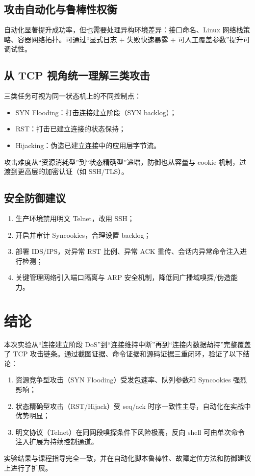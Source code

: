 \documentclass[12pt,hyperref,a4paper,UTF8,fontset=none]{ctexart}
\begin{document}
\subsection{攻击自动化与鲁棒性权衡}
自动化显著提升成功率，但也需要处理异构环境差异：接口命名、Linux 网络栈策略、容器网络拓扑。可通过“显式日志 + 失败快速暴露 + 可人工覆盖参数”提升可调试性。

\subsection{从 TCP 视角统一理解三类攻击}
三类任务可视为同一状态机上的不同控制点：
\begin{itemize}
    \item SYN Flooding：打击连接建立阶段（SYN backlog）；
    \item RST：打击已建立连接的状态保持；
    \item Hijacking：伪造已建立连接中的应用层字节流。
\end{itemize}
攻击难度从“资源消耗型”到“状态精确型”递增，防御也从容量与 cookie 机制，过渡到更高层的加密认证（如 SSH/TLS）。

\subsection{安全防御建议}
\begin{enumerate}
    \item 生产环境禁用明文 Telnet，改用 SSH；
    \item 开启并审计 Syncookies，合理设置 backlog；
    \item 部署 IDS/IPS，对异常 RST 比例、异常 ACK 重传、会话内异常命令注入进行检测；
    \item 关键管理网络引入端口隔离与 ARP 安全机制，降低同广播域嗅探/伪造能力。
\end{enumerate}

\section{结论}
本次实验从“连接建立阶段 DoS”到“连接维持中断”再到“连接内数据劫持”完整覆盖了 TCP 攻击链条。通过截图证据、命令证据和源码证据三重闭环，验证了以下结论：
\begin{enumerate}
    \item 资源竞争型攻击（SYN Flooding）受发包速率、队列参数和 Syncookies 强烈影响；
    \item 状态精确型攻击（RST/Hijack）受 seq/ack 时序一致性主导，自动化在实战中优势明显；
    \item 明文协议（Telnet）在同网段嗅探条件下风险极高，反向 shell 可由单次命令注入扩展为持续控制通道。
\end{enumerate}

实验结果与课程指导完全一致，并在自动化脚本鲁棒性、故障定位方法和防御建议上进行了扩展。
\end{document}
